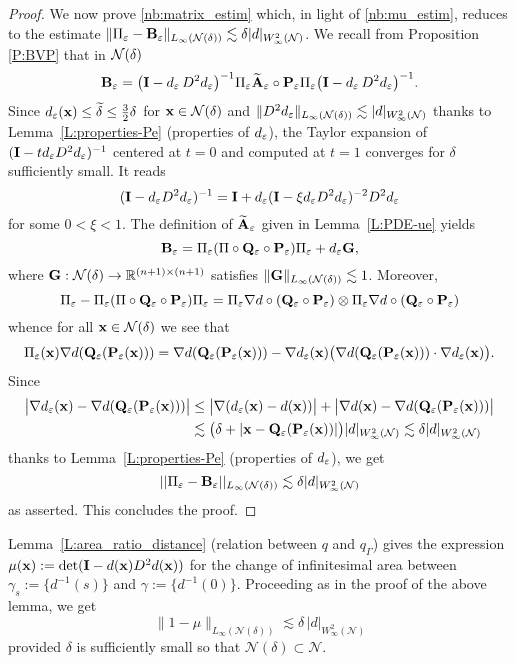 \begin{proof}
We now prove \eqref{nb:matrix_estim} which, in light of \eqref{nb:mu_estim}, reduces to
the estimate $\| \Pi_{\varepsilon} - {\bf B}_\varepsilon\|_{L_\infty(\mathcal N(\delta))} \lesssim \delta |d|_{W^2_\infty({\mathcal N})}$.
We recall from Proposition \ref{P:BVP} that in ${\mathcal{N}(\delta)}$
%
\[
{\mathbf{B}_\varepsilon} = \big({\bf I} - d_\varepsilon \, D^2d_\varepsilon \big)^{-1} \Pi_{\varepsilon} {\widetilde{\mathbf{A}}_\varepsilon}\circ{{\bf P}_\varepsilon} \Pi_{\varepsilon}
\big( {\bf I} - d_\varepsilon \, D^2d_\varepsilon \big)^{-1}.
\]
%
Since $d_\varepsilon({\bf x}) \le \widetilde \delta \leq \frac{3}{2}\delta$ for ${\bf x} \in {\mathcal{N}(\delta)}$ and $\| D^2 d_\varepsilon \|_{L_\infty(\mathcal N(\delta))} \lesssim |d|_{W^2_\infty(\mathcal N)}$ thanks to Lemma~\ref{L:properties-Pe} (properties of $d_\varepsilon$),  
the Taylor expansion of  $({\bf I} - t d_\varepsilon D^2d_\varepsilon)^{-1}$ centered at $t=0$ and computed
at $t=1$ converges for $\delta$ sufficiently small. It reads
%
$$
({\bf I} - d_\varepsilon D^2 d_\varepsilon)^{-1} = {\bf I} +  d_\varepsilon  ({\bf I}- \xi d_\varepsilon D^2 d_\varepsilon)^{-2} D^2 d_\varepsilon
$$  
for some $0< \xi <1$. The definition of ${\widetilde{\mathbf{A}}_\varepsilon}$ given in Lemma~\ref{L:PDE-ue} yields
$$
{\mathbf{B}_\varepsilon} =\Pi_{\varepsilon} (\Pi\circ {\bf Q}_{\varepsilon} \circ {\bf P}_{\varepsilon}) \Pi_{\varepsilon} +  d_\varepsilon {\bf G},
$$
where ${\bf G}:\mathcal N(\delta) \rightarrow \mathbb R^{(n+1)\times (n+1)}$ satisfies $\| {\bf G} \|_{L_\infty(\mathcal N(\delta))} \lesssim 1$. 
Moreover,
%
\[
\Pi_{\varepsilon} - \Pi_{\varepsilon} (\Pi \circ {\bf Q}_{\varepsilon} \circ {\bf P}_{\varepsilon}) \Pi_{\varepsilon} = \Pi_{\varepsilon} \nabla d \circ ({\bf Q}_{\varepsilon} \circ {\bf P}_{\varepsilon})  \otimes \Pi_{\varepsilon} \nabla  d \circ ({\bf Q}_{\varepsilon} \circ {\bf P}_{\varepsilon})
\]
%
whence for all ${\bf x}\in{\mathcal{N}(\delta)}$ we see that
%
\[
\Pi_{\varepsilon}({\bf x}) \nabla d({\bf Q}_{\varepsilon}({\bf P}_{\varepsilon}({\bf x}))) =
\nabla d({\bf Q}_{\varepsilon}({\bf P}_{\varepsilon}({\bf x}))) -
\nabla d_\varepsilon({\bf x}) \big(\nabla d({\bf Q}_{\varepsilon}({\bf P}_{\varepsilon}({\bf x}))) \cdot\nabla d_\varepsilon({\bf x})\big).
\]
%
Since
%
\begin{align*}
  \big| \nabla d_\varepsilon({\bf x}) - \nabla d({\bf Q}_{\varepsilon}({\bf P}_{\varepsilon}({\bf x}))) \big| &\leq
  \big | \nabla (d_\varepsilon({\bf x}) -d({\bf x})) \big| + \big| \nabla d({\bf x}) - \nabla d({\bf Q}_{\varepsilon}({\bf P}_{\varepsilon}({\bf x}))) \big| \\
  &\lesssim \big(\delta+|{\bf x} -{\bf Q}_{\varepsilon}({\bf P}_{\varepsilon}({\bf x}))| \big) |d|_{W^2_\infty(\mathcal{N})}
  \lesssim \delta |d|_{W^2_\infty(\mathcal{N})}
\end{align*}
%
thanks to Lemma~\ref{L:properties-Pe} (properties of $d_\varepsilon$), we get
%
\begin{equation*}\label{e:narrow_matrix_A}
|| \Pi_{\varepsilon} - {\mathbf{B}_\varepsilon}||_{L_\infty({\mathcal{N}(\delta)})} \lesssim \delta |d|_{W^2_\infty(\mathcal{N})}
\end{equation*}
%
as asserted. This concludes the proof.
\end{proof}
\begin{remark}[estimate of $\mu$]\label{r:narrow:mu}
Lemma~\ref{L:area_ratio_distance} (relation between $q$ and $q_\Gamma$) gives
the expression $\mu({\bf x}):= \det({\bf I}-d({\bf x}) D^2 d({\bf x}))$ for the change of infinitesimal
area between $\gamma_s:=\{ d^{-1}(s)\}$ and $\gamma := \{ d^{-1}(0)\}$.
Proceeding as in the proof of the above lemma, we get
%
\begin{equation}\label{nb:mu_estim_d}
\|1-\mu\|_{L_\infty(\mathcal N(\delta))} \lesssim  \delta \, |d|_{W^2_\infty(\mathcal{N})}
\end{equation}
provided $\delta$ is sufficiently small so that
$\mathcal N(\delta) \subset \mathcal N$.
\end{remark}
